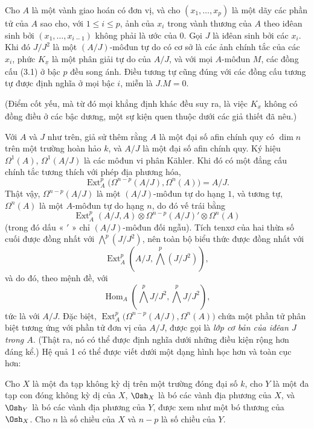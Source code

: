  Cho $A$ là một vành giao hoán có đơn vị, và cho
$(x_1,\ldots,x_p)$ là một dãy các phần tử của $A$ sao cho, với $1\leq i\leq p$,
ảnh của $x_i$ trong vành thương của $A$ theo iđêan sinh bởi
$(x_1,\ldots,x_{i-1})$ không phải là ước của $0$. Gọi $J$ là iđêan sinh
bởi các $x_i$. Khi đó $J/J^{2}$ là một $(A/J)$-môđun tự do có cơ sở là các
ảnh chính tắc của các $x_i$, phức $K_{\underline{x}}$ là một
phân giải tự do của $A/J$, và với mọi $A$-môđun $M$, các đồng cấu (3.1) ở
bậc $p$ đều song ánh. Điều tương tự cũng đúng với các đồng cấu tương tự
được định nghĩa ở mọi bậc $i$, miễn là $J.M=0$.

(Điểm cốt yếu, mà từ đó mọi khẳng định khác đều suy ra, là việc
$K_{\underline{x}}$ không có đồng điều ở các bậc dương, một sự kiện quen thuộc dưới các giả thiết đã nêu.)

 Với $A$ và $J$ như trên, giả sử thêm rằng
$A$ là một đại số afin chính quy có $\dim n$ trên một trường hoàn hảo $k$, và
$A/J$ là một đại số afin chính quy. Ký hiệu $\Omega^{1}(A)$,
$\Omega^{1}(A/J)$ là các môđun vi phân Kähler. Khi đó có một
đẳng cấu chính tắc tương thích với phép địa phương hóa,
\begin{equation}\tag{3.5}
  \operatorname{Ext}_{A}^{p}\bigl(\Omega^{n-p}(A/J),\Omega^{n}(A)\bigr)=A/J.
\end{equation}
Thật vậy, $\Omega^{n-p}(A/J)$ là một $(A/J)$-môđun tự do hạng $1$, và tương tự,
$\Omega^{n}(A)$ là một $A$-môđun tự do hạng $n$,
do đó vế trái bằng
\[
  \operatorname{Ext}_{A}^{p}(A/J,A)
  \otimes\Omega^{n-p}(A/J)'\otimes\Omega^{n}(A)
\]
(trong đó dấu « $'$ » chỉ $(A/J)$-môđun đối ngẫu). Tích tenxơ của
hai thừa số cuối được đồng nhất với $\bigwedge^{p}(J/J^{2})$,
nên toàn bộ biểu thức
được đồng nhất với
\[
  \operatorname{Ext}_{A}^{p}\!\left(A/J,\bigwedge^{p}(J/J^{2})\right),
\]
và do đó, theo mệnh đề, với
\[
  \operatorname{Hom}_{A}\!\left(\bigwedge^{p}J/J^{2},
  \bigwedge^{p}J/J^{2}\right),
\]
tức là với $A/J$. Đặc biệt,
$\operatorname{Ext}_{A}^{p}\bigl(\Omega^{n-p}(A/J),\Omega^{n}(A)\bigr)$ chứa
một phần tử phân biệt tương ứng với phần tử đơn vị của $A/J$, được gọi là
\emph{lớp cơ bản của iđêan $J$ trong $A$}. (Thật ra, nó có thể được
định nghĩa dưới những điều kiện rộng hơn đáng kể.) Hệ quả 1 có thể được viết
dưới một dạng hình học hơn và toàn cục hơn:

 Cho $X$ là một đa tạp không kỳ dị trên một trường đóng
đại số $k$, cho $Y$ là một đa tạp con đóng không kỳ dị của $X$,
$\Osh_X$ là bó các vành địa phương của $X$, và $\Osh_Y$ là bó các vành
địa phương của $Y$, được xem như một bó thương của $\Osh_X$. Cho $n$ là
số chiều của $X$ và $n-p$ là số chiều của $Y$.

